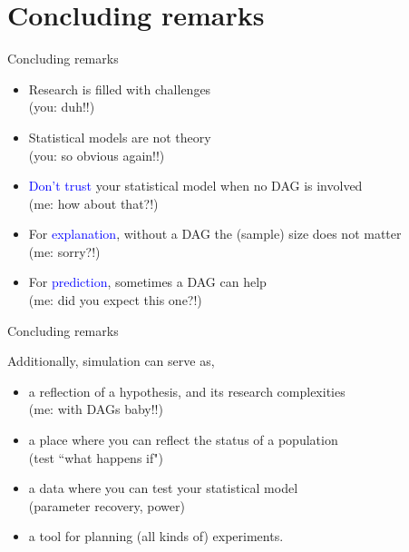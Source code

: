 \section{Concluding remarks}
%
\begin{frame}[negative]
	\sectionpage
\end{frame}
%
%
\begin{lhframe}[rhgraphic={\texttt{[image: think1.jpg]}}]
	{Concluding remarks}
	
	\begin{itemize}
		\item Research is filled with challenges \\
		{\small (you: duh!!) }
		\item Statistical models are not theory \\
		{\small (you: so obvious again!!) }
		\item \textcolor{blue}{Don't trust} your statistical model when no DAG is involved \\
		{\small (me: how about that?!) }
		\item For \textcolor{blue}{explanation}, without a DAG the (sample) size does not matter \\
		{\small (me: sorry?!) }
		\item For \textcolor{blue}{prediction}, sometimes a DAG can help \\
		{\small (me: did you expect this one?!)}
	\end{itemize} 
\end{lhframe}
%
%
\begin{lhframe}[rhgraphic={\texttt{[image: think2.jpg]}}]
	{Concluding remarks}
	
	Additionally, simulation can serve as,
	\begin{itemize}
		\item a reflection of a hypothesis, and its research complexities\\
		{\small (me: with DAGs baby!!)}
		\item a place where you can reflect the status of a population \\
		{\small (test ``what happens if") }
		\item a data where you can test your statistical model \\
		{\small (parameter recovery, power) }
		\item a tool for planning (all kinds of) experiments.
	\end{itemize} 
\end{lhframe}
%
%
